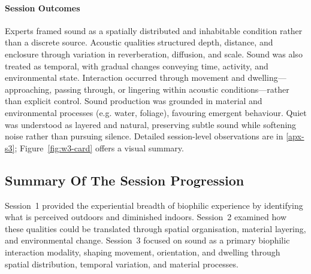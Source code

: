 \paragraph{Session Outcomes} 
Experts framed sound as a spatially distributed and inhabitable condition rather than a discrete source. Acoustic qualities structured depth, distance, and enclosure through variation in reverberation, diffusion, and scale. Sound was also treated as temporal, with gradual changes conveying time, activity, and environmental state. Interaction occurred through movement and dwelling—approaching, passing through, or lingering within acoustic conditions—rather than explicit control. Sound production was grounded in material and environmental processes (e.g. water, foliage), favouring emergent behaviour. Quiet was understood as layered and natural, preserving subtle sound while softening noise rather than pursuing silence. Detailed session-level observations are in \autoref{apx-s3}; Figure~\ref{fig:w3-card} offers a visual summary.

\subsection{Summary Of The Session Progression}
Session~1 provided the experiential breadth of biophilic experience by identifying what is perceived outdoors and diminished indoors. Session~2 examined how these qualities could be translated through spatial organisation, material layering, and environmental change. Session~3 focused on sound as a primary biophilic interaction modality, shaping movement, orientation, and dwelling through spatial distribution, temporal variation, and material processes.